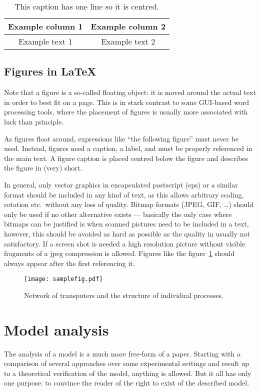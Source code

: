 \documentclass[12pt]{article}
\theoremstyle{plain}
\theoremstyle{definition}
\theoremstyle{remark}
\begin{document}
\begin{table}[hbtp]
  \caption{This caption has one line so it is centred.}\label{tab:sample} 
  \centering
  \begin{tabular}{|c|c|}
    \hline
    Example column 1 & Example column 2 \\
    \hline
    Example text 1 & Example text 2 \\
    \hline
  \end{tabular}
\end{table}


\subsection{Figures in \LaTeX}
\label{sec:model:subsec:figures}
Note that a figure is a so-called floating object: it is moved around the actual
text in order to best fit on a page. This is in stark contrast to some
GUI-based word processing tools, where the placement of figures is
usually more associated with luck than principle.

As figures float around, expressions like ``the following figure''
must never be used. Instead, figures need a caption, a label, and must
be properly referenced in the main text. A figure caption is placed centred below the figure and describes the figure in (very) short. 

In general, only vector graphics in encapsulated postscript (eps) or a similar format should be included in any kind of text, as this allows arbitrary scaling, rotation etc.\ without any loss of quality. Bitmap formats (JPEG, GIF, \dots) should only be used if no other alternative exists
--- basically the only case where bitmaps can be justified is when scanned pictures need to be included in a text, however, this should be avoided as hard as possible as the quality in usually not satisfactory. If a screen shot is needed a high resolution picture without visible fragments of a jpeg compression is allowed. Figures like the figure~\ref{fig:samplefig} should always appear after the first referencing it.
\begin{figure}[hbtp]
	 \centerline{\texttt{[image: samplefig.pdf]}}
	 {\caption{Network of transputers and the structure of individual
processes.}\label{fig:samplefig}}
\end{figure}

\section{Model analysis}
\label{sec:analysis}
The analysis of a model is a much more free-form of a paper. Starting with a comparison of several approaches over some experimental settings and result up to a theoretical verification of the model, anything is allowed. But it all has only one purpose: to convince the reader of the right to exist of the described model.
\end{document}
